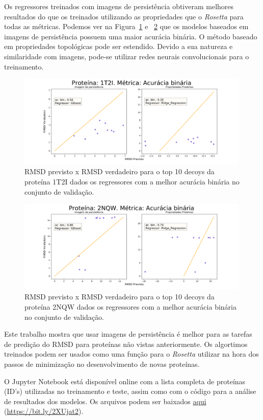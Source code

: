Os regressores treinados com imagens de persistência obtiveram melhores resultados 
do que os treinados utilizando as propriedades que o \textit{Rosetta} para todas as métricas.
Podemos ver na Figura~\ref{fig:1t2i_binary} e ~\ref{fig:2nqw_binary} que os modelos baseados em 
imagens de persistência possuem uma maior acurácia binária. O método baseado em propriedades topológicas
pode ser estendido. Devido a sua natureza e similaridade com imagens, pode-se utilizar redes neurais 
convolucionais para o treinamento. 
\begin{figure}[!htbp]
    \centering
    \includegraphics[width=0.99\textwidth]{beamer/images/1t2i_binary.png}
    \caption{RMSD previsto x RMSD verdadeiro para o top 10 decoys da proteína 1T2I dados os 
             regressores com a melhor acurácia binária no conjunto de validação.}
    \label{fig:1t2i_binary}
    \fautor
\end{figure}

\begin{figure}[!htbp]
    \centering
    \includegraphics[width=0.99\textwidth]{beamer/images/2nqw_binary.png}
    \caption{RMSD previsto x RMSD verdadeiro para o top 10 decoys da proteína 2NQW dados os 
             regressores com a melhor acurácia binária no conjunto de validação.}
    \label{fig:2nqw_binary}
    \fautor
\end{figure}

Este trabalho mostra que usar imagens de persistência é melhor para as tarefas de predição do RMSD
para proteínas não vistas anteriormente. Os algortimos treinados podem ser usados como uma função
para o \textit{Rosetta} utilizar na hora dos passos de minimização no desenvolvimento de novas proteínas.

O Jupyter Notebook \cite{Kluyver2016} está disponível online com a lista completa de proteínas (ID's) utilizadas 
no treinamento e teste, assim como com o código para a análise de resultados dos modelos. Os arquivos
podem ser baixados \href{https://drive.google.com/file/d/160DZgRiPwsHNaTzasQxd2VaIXCUkiLZG/view?usp=sharing}{aqui}
(\url{https://bit.ly/2XUjat2}).

